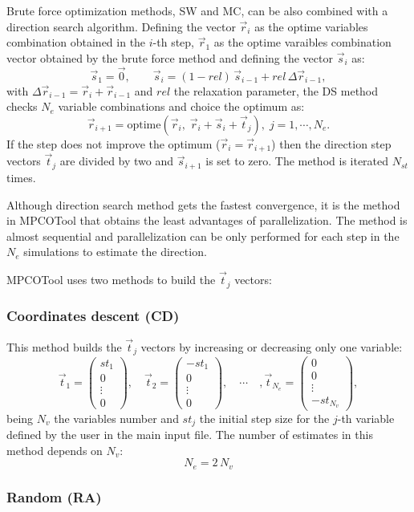 \documentclass[review,authoryear]{elsarticle}
\newcommand{\EQ}[2]
{\begin{equation}#1\label{#2}\end{equation}}
\newcommand{\MATRIX}[2]{\PA{\begin{array}{#1}#2\end{array}}}
\newcommand{\PA}[1]{\left(#1\right)}
\begin{document}
Brute force optimization methods, SW and MC, can be also combined
with a direction search algorithm. Defining the vector $\vec{r}_i$ as the optime
variables combination obtained in the $i$-th step, $\vec{r}_1$ as the optime
varaibles combination vector obtained by the brute force method and defining
the vector $\vec{s}_i$ as:
\EQ
{
	\vec{s}_1=\vec{0},\qquad
	\vec{s}_i=(1-rel)\,\vec{s}_{i-1}+rel\,\Delta\vec{r}_{i-1},
}{Eqs}
with $\Delta\vec{r}_{i-1}=\vec{r}_i+\vec{r}_{i-1}$ and $rel$ the
relaxation parameter, the DS method checks $N_e$
variable combinations and choice the optimum as:
\EQ
{
	\vec{r}_{i+1}=\mathrm{optime}\PA{\vec{r}_i,\;\vec{r}_i+\vec{s}_i+\vec{t}_j},
	\;j=1,\cdots,N_e.
}{EqDirection}
If the step does not improve the optimum ($\vec{r}_i=\vec{r}_{i+1}$) then the
direction step vectors $\vec{t}_j$ are divided by two and $\vec{s}_{i+1}$ is set
to zero. The method is iterated $N_{st}$ times.

Although direction search method gets the fastest convergence, it is the method
in MPCOTool that obtains the least advantages of parallelization. The method is
almost sequential and parallelization can be only performed for each step in the
$N_e$ simulations to estimate the direction.

MPCOTool uses two methods to build the $\vec{t}_j$ vectors:

\subsubsection{Coordinates descent (CD)}

This method builds the $\vec{t}_j$ vectors by increasing or decreasing only one
variable:
\EQ
{
	\vec{t}_1=\MATRIX{c}{st_1\\0\\\vdots\\0},\quad
	\vec{t}_2=\MATRIX{c}{-st_1\\0\\\vdots\\0},\quad
	\cdots\quad,\vec{t}_{N_e}=\MATRIX{c}{0\\0\\\vdots\\-st_{N_v}},
}{EqtDescent}
being $N_v$ the variables number and $st_j$ the initial step size for the $j$-th
variable defined by the user in the main input file. The number of estimates in
this method depends on $N_v$:
\EQ{N_e=2\,N_v}{EqNestimatesDescent}

\subsubsection{Random (RA)}
\end{document}
